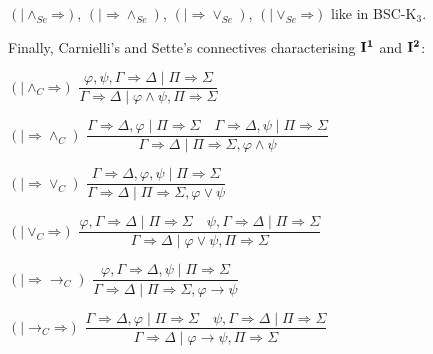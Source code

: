 \documentclass[10pt,a4paper]{article}
\theoremstyle{definition}
\newcommand{\3}{\vspace{.3in}}
\newcommand{\2}{\vspace{.2in}}
\newcommand{\1}{\vspace{.1in}}
\newcommand{\5}{\vspace{.05in}}
\begin{document}
$(\mathord{\mid\wedge_{Se}}\mathord{\Rightarrow})$,
$(\mathord{\mid\Rightarrow}\mathord{\wedge_{Se}})$, $(\mathord{\mid\Rightarrow}\mathord{\vee_{Se}})$,
$(\mathord{\mid\vee_{Se}}\mathord{\Rightarrow})$ like in BSC-K$_3$.

\1

Finally, Carnielli's and Sette's connectives characterising ${\bf I^1}$ and ${\bf I^2}$:

\begin{flushleft}
	 $(\mathord{{\mid}\wedge_C}\mathord{\Rightarrow})$  $\dfrac{\varphi, \psi,
			\Gamma \Rightarrow \Delta \mid \Pi\Rightarrow\Sigma}{ \Gamma
			\Rightarrow \Delta \mid \varphi\wedge\psi, \Pi\Rightarrow\Sigma}$
\end{flushleft} \begin{flushleft}
$(\mathord{\mid\Rightarrow}\mathord{\wedge_C})$  $\dfrac{\Gamma
			\Rightarrow \Delta, \varphi \mid \Pi\Rightarrow\Sigma \quad
			\Gamma\Rightarrow \Delta, \psi \mid \Pi\Rightarrow\Sigma}{\Gamma \Rightarrow \Delta \mid \Pi\Rightarrow\Sigma, \varphi\wedge\psi}$
\end{flushleft}
	
\begin{flushleft}
	 $(\mathord{\mid\Rightarrow}\mathord{\vee_C})$	  $\dfrac{\Gamma
			\Rightarrow \Delta, \varphi, \psi \mid \Pi\Rightarrow\Sigma }{		\Gamma\Rightarrow \Delta \mid\Pi\Rightarrow\Sigma, \varphi\vee\psi}$
\end{flushleft} \begin{flushleft}
$(\mathord{{\mid}\vee_C}\mathord{\Rightarrow})$	  $\dfrac{\varphi, \Gamma
			\Rightarrow \Delta \mid \Pi\Rightarrow\Sigma \quad \psi, \Gamma
			\Rightarrow \Delta \mid \Pi\Rightarrow\Sigma}
		{\Gamma\Rightarrow \Delta \mid
			\varphi\vee\psi, \Pi\Rightarrow\Sigma}$
\end{flushleft}
\begin{flushleft}
	 $(\mathord{\mid\Rightarrow}\mathord{\rightarrow_C})$ $\dfrac{\varphi, \Gamma
			\Rightarrow \Delta, \psi \mid \Pi\Rightarrow\Sigma}{\Gamma\Rightarrow\Delta \mid \Pi\Rightarrow\Sigma, \varphi\rightarrow\psi}$
\end{flushleft} \begin{flushleft}
$(\mathord{\mid\rightarrow_C}\mathord{\Rightarrow})$ $\dfrac{\Gamma
			\Rightarrow \Delta, \varphi \mid \Pi\Rightarrow\Sigma \quad \psi, \Gamma\Rightarrow\Delta \mid \Pi \Rightarrow \Sigma } {\Gamma
			\Rightarrow \Delta \mid \varphi\rightarrow\psi, \Pi\Rightarrow\Sigma}$
\end{flushleft}
	
\end{document}
